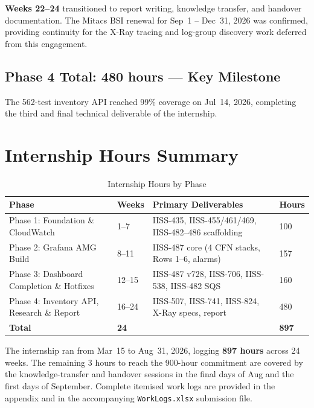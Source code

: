 \textbf{Weeks 22--24} transitioned to report writing, knowledge transfer,
and handover documentation. The Mitacs BSI renewal for
Sep~1 -- Dec~31, 2026 was confirmed, providing continuity for
the X-Ray tracing and log-group discovery work deferred from this engagement.

\subsection{Phase 4 Total: 480 hours --- Key Milestone}

The 562-test inventory API reached 99\% coverage on Jul~14, 2026, completing
the third and final technical deliverable of the internship.

\section{Internship Hours Summary}
\label{sec:wb_hours}

\begin{table}[ht]
\centering
\caption{Internship Hours by Phase}
\label{tab:wb_hours}
\begin{tabular}{p{5.0cm}p{1.2cm}p{5.5cm}p{1.5cm}}
\toprule
\textbf{Phase} & \textbf{Weeks} & \textbf{Primary Deliverables} & \textbf{Hours} \\
\midrule
Phase 1: Foundation \& CloudWatch & 1--7 & IISS-435, IISS-455/461/469, IISS-482--486 scaffolding & 100 \\
Phase 2: Grafana AMG Build & 8--11 & IISS-487 core (4 CFN stacks, Rows 1--6, alarms) & 157 \\
Phase 3: Dashboard Completion \& Hotfixes & 12--15 & IISS-487 v728, IISS-706, IISS-538, IISS-482 SQS & 160 \\
Phase 4: Inventory API, Research \& Report & 16--24 & IISS-507, IISS-741, IISS-824, X-Ray specs, report & 480 \\
\midrule
\textbf{Total} & \textbf{24} & & \textbf{897} \\
\bottomrule
\end{tabular}
\end{table}

The internship ran from Mar~15 to Aug~31, 2026, logging
\textbf{897 hours} across 24 weeks. The remaining 3 hours to reach the
900-hour commitment are covered by the knowledge-transfer and handover
sessions in the final days of Aug and the first days of September.
Complete itemised work logs are provided in the appendix and in the
accompanying \texttt{WorkLogs.xlsx} submission file.
